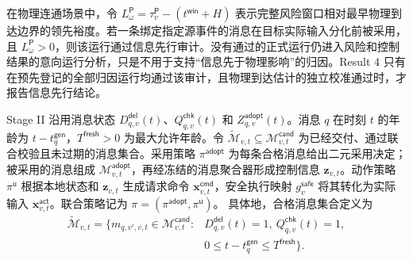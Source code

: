 \documentclass[10pt,a4paper,twocolumn]{article}
\begin{document}
在物理连通场景中，令 $L_{\omega}^{\mathsf P}=\tau_v^{\mathsf P}-(t^{\mathsf{win}}+H)$ 表示完整风险窗口相对最早物理到达边界的领先裕度。若一条绑定指定源事件的消息在目标实际输入分化前被采用，且 $L_{\omega}^{\mathsf P}>0$，则该运行通过信息先行审计。没有通过的正式运行仍进入风险和控制结果的意向运行分析，只是不用于支持“信息先于物理影响”的归因。Result 4 只有在预先登记的全部归因运行均通过该审计，且物理到达估计的独立校准通过时，才报告信息先行结论。

Stage II 沿用消息状态 $D_{q,v}^{\mathsf{del}}(t)$、$Q_{q,v}^{\mathsf{chk}}(t)$ 和 $Z_{q,v}^{\mathsf{adopt}}(t)$。消息 $q$ 在时刻 $t$ 的年龄为 $t-t_q^{\mathsf{gen}}$，$T^{\mathsf{fresh}}>0$ 为最大允许年龄。令 $\widetilde{\mathcal M}_{v,t}\subseteq\mathcal M_{v,t}^{\mathsf{cand}}$ 为已经交付、通过联合校验且未过期的消息集合。采用策略 $\pi^{\mathsf{adopt}}$ 为每条合格消息给出二元采用决定；被采用的消息组成 $\mathcal M_{v,t}^{\mathsf{adopt}}$，再经冻结的消息聚合器形成控制信息 $\bm z_{v,t}$。动作策略 $\pi^{\mathsf u}$ 根据本地状态和 $\bm z_{v,t}$ 生成请求命令 $\bm x_{v,t}^{\mathsf{cmd}}$，安全执行映射 $g_v^{\mathsf{safe}}$ 将其转化为实际输入 $\bm x_{v,t}^{\mathsf{act}}$。联合策略记为 $\pi=(\pi^{\mathsf{adopt}},\pi^{\mathsf u})$。
具体地，合格消息集合定义为
\begin{equation*}
\begin{aligned}
\widetilde{\mathcal M}_{v,t}=\{m_{q,v',v,t}\in \mathcal M_{v,t}^{\mathsf{cand}}:
&D_{q,v}^{\mathsf{del}}(t)=1,\ Q_{q,v}^{\mathsf{chk}}(t)=1,\\
&0\leq t-t_q^{\mathsf{gen}}\leq T^{\mathsf{fresh}}\}.
\end{aligned}
\end{equation*}
\end{document}
